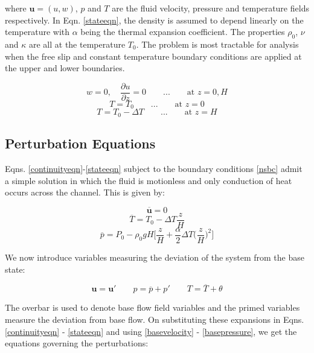 \documentclass[paper=a4, fontsize=11pt]{scrartcl}
\numberwithin{equation}{section}		%
\numberwithin{figure}{section}			%
\numberwithin{table}{section}				%
\begin{document}
where $\mathbf{u} = (u,w)$, $p$ and $T$ are the fluid velocity, pressure and temperature fields respectively. In Eqn. \ref{stateeqn}, the density is assumed to depend linearly on the temperature with $\alpha$ being the thermal expansion coefficient. The properties $\rho_0$, $\nu$ and $\kappa$ are all at the temperature $T_0$. 
The problem is most tractable for analysis when the free slip and constant temperature boundary conditions are applied at the upper and lower boundaries.

\begin{equation*}
	w = 0, \quad \frac{\partial u}{\partial z} = 0 \qquad ... \qquad \text{at } z = 0, H
\end{equation*}
\begin{equation}
	T = T_0 \qquad ... \qquad \text{at } z = 0
	\label{nsbc}
\end{equation}
\begin{equation*}
	T = T_0 - \Delta T \qquad ... \qquad \text{at } z = H
\end{equation*}

\subsection{Perturbation Equations}
Eqns. \ref{continuityeqn}-\ref{stateeqn} subject to the boundary conditions \ref{nsbc} admit a simple solution in which the fluid is motionless and only conduction of heat occurs across the channel. This is given by:

\begin{equation}
	\overline{\mathbf{u}} = 0
	\label{basevelocity}
\end{equation}
\begin{equation}
	\overline{T} = T_0 - \Delta T \frac{z}{H}
	\label{basetemperature}
\end{equation}
\begin{equation}
	\overline{p} = P_0 - \rho_0 g H \biggl[\frac{z}{H} + \frac{\alpha}{2}\Delta T \biggl(\frac{z}{H}\biggr)^2\biggr]
	\label{basepressure}
\end{equation}

\noindent We now introduce variables measuring the deviation of the system from the base state:

\begin{equation}
	\mathbf{u} = \mathbf{u'} \qquad p = \overline{p} + p' \qquad T = \overline{T} + \theta
	\label{expansion}
\end{equation}

The overbar is used to denote base flow field variables and the primed variables measure the deviation from base flow. On substituting these expansions in Eqns. \ref{continuityeqn} - \ref{stateeqn} and using \ref{basevelocity} - \ref{basepressure}, we get the equations governing the perturbations:
\end{document}
